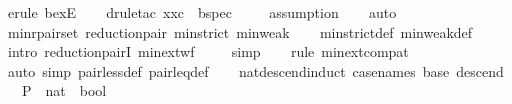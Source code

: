 \begin{isabellebody}
\ {\isacharparenleft}{\kern0pt}erule\ bexE{\isacharparenright}{\kern0pt}\isanewline
\ \ \isamarkupfalse%
\ {\isacharparenleft}{\kern0pt}drule{\isacharunderscore}{\kern0pt}tac\ x{\isacharequal}{\kern0pt}xc\ \ bspec{\isacharparenright}{\kern0pt}\isanewline
\ \ \ \isamarkupfalse%
\ assumption\isanewline
\ \ \isamarkupfalse%
\ auto\isanewline
\ \ \isamarkupfalse%
%
\endisatagproof
{\isafoldproof}%
%
\isadelimproof
\isanewline
%
\endisadelimproof
\isanewline
{}\isamarkupfalse%
\ min{\isacharunderscore}{\kern0pt}rpair{\isacharunderscore}{\kern0pt}set{\isacharcolon}{\kern0pt}\ {\isachardoublequoteopen}reduction{\isacharunderscore}{\kern0pt}pair\ {\isacharparenleft}{\kern0pt}min{\isacharunderscore}{\kern0pt}strict{\isacharcomma}{\kern0pt}\ min{\isacharunderscore}{\kern0pt}weak{\isacharparenright}{\kern0pt}{\isachardoublequoteclose}\isanewline
%
\isadelimproof
\ \ %
\endisadelimproof
%
\isatagproof
{}\isamarkupfalse%
\ min{\isacharunderscore}{\kern0pt}strict{\isacharunderscore}{\kern0pt}def\ min{\isacharunderscore}{\kern0pt}weak{\isacharunderscore}{\kern0pt}def\isanewline
\ \ \isamarkupfalse%
\ {\isacharparenleft}{\kern0pt}intro\ reduction{\isacharunderscore}{\kern0pt}pairI\ min{\isacharunderscore}{\kern0pt}ext{\isacharunderscore}{\kern0pt}wf{\isacharparenright}{\kern0pt}\isanewline
\ \ \ \isamarkupfalse%
\ simp\isanewline
\ \ \isamarkupfalse%
\ {\isacharparenleft}{\kern0pt}rule\ min{\isacharunderscore}{\kern0pt}ext{\isacharunderscore}{\kern0pt}compat{\isacharparenright}{\kern0pt}\isanewline
\ \ \isamarkupfalse%
\ {\isacharparenleft}{\kern0pt}auto\ simp{\isacharcolon}{\kern0pt}\ pair{\isacharunderscore}{\kern0pt}less{\isacharunderscore}{\kern0pt}def\ pair{\isacharunderscore}{\kern0pt}leq{\isacharunderscore}{\kern0pt}def{\isacharparenright}{\kern0pt}\isanewline
\ \ \isamarkupfalse%
%
\endisatagproof
{\isafoldproof}%
%
\isadelimproof
%
\endisadelimproof
%
\isadelimdocument
%
\endisadelimdocument
%
\isatagdocument
%
\isamarkuptrue%
%
\endisatagdocument
{\isafolddocument}%
%
\isadelimdocument
%
\endisadelimdocument
{}\isamarkupfalse%
\ nat{\isacharunderscore}{\kern0pt}descend{\isacharunderscore}{\kern0pt}induct\ {\isacharbrackleft}{\kern0pt}case{\isacharunderscore}{\kern0pt}names\ base\ descend{\isacharbrackright}{\kern0pt}{\isacharcolon}{\kern0pt}\isanewline
\ \ \ P\ {\isacharcolon}{\kern0pt}{\isacharcolon}{\kern0pt}\ {\isachardoublequoteopen}nat\ {\isasymRightarrow}\ bool{\isachardoublequoteclose}\isanewline

\end{isabellebody}
